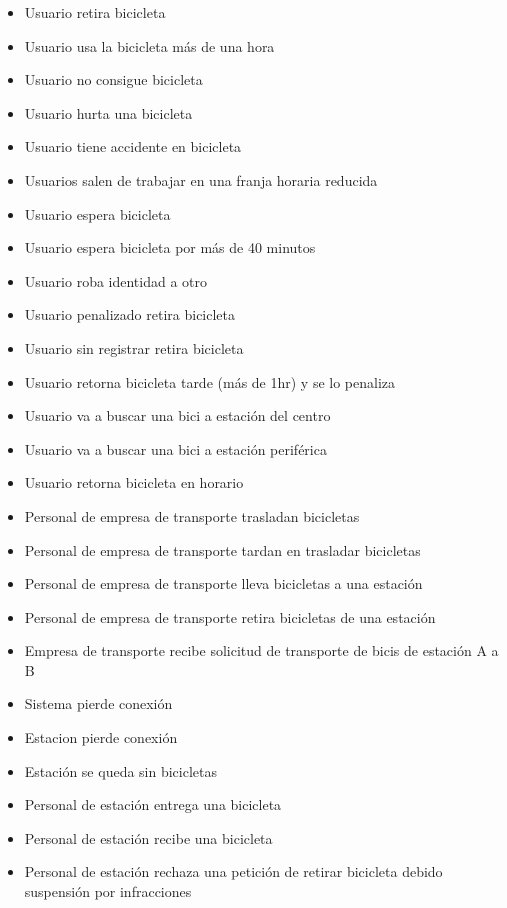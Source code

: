 \documentclass[a4paper, 10pt, twoside]{article}
\begin{document}
\begin{multicols}{2}
  \begin{itemize}
    \item Usuario retira bicicleta	
    \item Usuario usa la bicicleta más de una hora
    \item Usuario no consigue bicicleta
    \item Usuario hurta una bicicleta	
    \item Usuario tiene accidente en bicicleta
    \item Usuarios salen de trabajar en una franja horaria reducida	
    \item Usuario espera bicicleta
    \item Usuario espera bicicleta por más de 40 minutos 
    \item Usuario roba identidad a otro
    \item Usuario penalizado retira bicicleta	
    \item Usuario sin registrar retira bicicleta
    \item Usuario retorna bicicleta tarde (más de 1hr) y se lo penaliza
    \item Usuario va a buscar una bici a estación del centro
    \item Usuario va a buscar una bici a estación periférica
    \item Usuario retorna bicicleta en horario 
    \item Personal de empresa de transporte trasladan bicicletas
    \item Personal de empresa de transporte tardan en trasladar bicicletas
    \item Personal de empresa de transporte lleva bicicletas a una estación
    \item Personal de empresa de transporte retira bicicletas de una estación
    \item Empresa de transporte recibe solicitud de transporte de bicis de estación A a B 
    \item Sistema pierde conexión
    \item Estacion pierde conexión
    \item Estación se queda sin bicicletas
    \item Personal de estación entrega una bicicleta 
    \item Personal de estación recibe una bicicleta
    \item Personal de estación rechaza una petición de retirar bicicleta debido suspensión por infracciones

\end{itemize}
\end{multicols}
\end{document}
